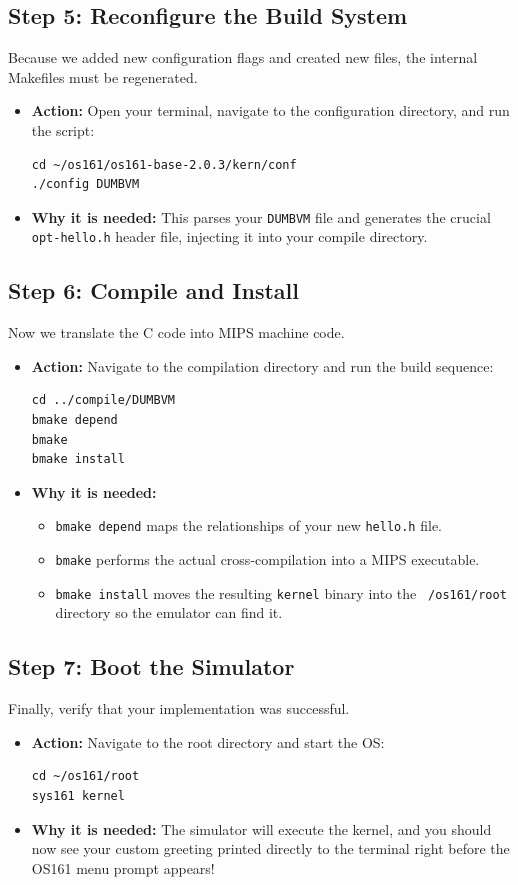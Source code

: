 \subsection{Step 5: Reconfigure the Build System}
Because we added new configuration flags and created new files, the internal Makefiles must be regenerated.
\begin{itemize}
    \item \textbf{Action:} Open your terminal, navigate to the configuration directory, and run the script:
\begin{verbatim}
cd ~/os161/os161-base-2.0.3/kern/conf
./config DUMBVM
\end{verbatim}
    \item \textbf{Why it is needed:} This parses your \texttt{DUMBVM} file and generates the crucial \texttt{opt-hello.h} header file, injecting it into your compile directory.
\end{itemize}

\subsection{Step 6: Compile and Install}
Now we translate the C code into MIPS machine code.
\begin{itemize}
    \item \textbf{Action:} Navigate to the compilation directory and run the build sequence:
\begin{verbatim}
cd ../compile/DUMBVM
bmake depend
bmake
bmake install
\end{verbatim}
    \item \textbf{Why it is needed:} 
    \begin{itemize}
        \item \texttt{bmake depend} maps the relationships of your new \texttt{hello.h} file.
        \item \texttt{bmake} performs the actual cross-compilation into a MIPS executable. 
        \item \texttt{bmake install} moves the resulting \texttt{kernel} binary into the \texttt{~/os161/root} directory so the emulator can find it.
    \end{itemize}
\end{itemize}

\subsection{Step 7: Boot the Simulator}
Finally, verify that your implementation was successful.
\begin{itemize}
    \item \textbf{Action:} Navigate to the root directory and start the OS:
\begin{verbatim}
cd ~/os161/root
sys161 kernel
\end{verbatim}
    \item \textbf{Why it is needed:} The simulator will execute the kernel, and you should now see your custom greeting printed directly to the terminal right before the OS161 menu prompt appears!
\end{itemize}

